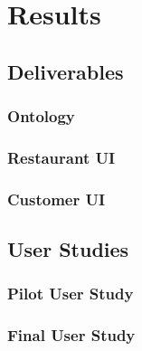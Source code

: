 \chapter{Results}

\section{Deliverables}

\subsection{Ontology}

\subsection{Restaurant UI}

\subsection{Customer UI}

\section{User Studies}

\subsection{Pilot User Study}

\subsection{Final User Study}

